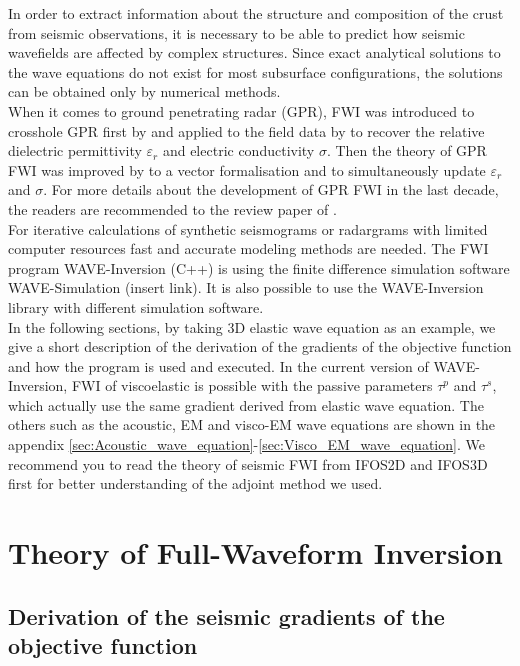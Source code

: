 \documentclass[pdftex,a4paper,parskip,listof=totoc,bibliography=totoc,onehalfspacing,12pt]{scrreprt}
\begin{document}
In order to extract information about the structure and composition of the crust from seismic observations, it is necessary to be able to predict how seismic wavefields are affected by complex structures. Since exact analytical
solutions to the wave equations do not exist for most subsurface configurations, the solutions can be obtained only by numerical methods. \\
When it comes to ground penetrating radar (GPR), FWI was introduced to crosshole GPR first by \cite{ernst2007full} and applied to the field data by \cite{ernst2007application} to recover the relative dielectric permittivity $\varepsilon_r$ and electric conductivity $\sigma$. Then the theory of GPR FWI was improved by \cite{meles2010new} to a vector formalisation and to simultaneously update  $\varepsilon_r$ and $\sigma$. For more details about the development of GPR FWI in the last decade, the readers are recommended to the review paper of \cite{klotzsche2019review}.\\
For iterative calculations of synthetic seismograms or radargrams with limited computer resources fast and accurate modeling methods are needed. The FWI program WAVE-Inversion (C++) is using the finite difference simulation software WAVE-Simulation (insert link). It is also possible to use the WAVE-Inversion library with different simulation software.\\
In the following sections, by taking 3D elastic wave equation as an example, we give a short description of the derivation of the gradients of the objective function and how the program is used and executed. In the current version of WAVE-Inversion, FWI of viscoelastic is possible with the passive parameters $\tau^p$ and $\tau^s$, which actually use the same gradient derived from elastic wave equation. The others such as the acoustic, EM and visco-EM wave equations are shown in the appendix \ref{sec:Acoustic_wave_equation}-\ref{sec:Visco_EM_wave_equation}.
We recommend you to read the theory of seismic FWI from IFOS2D and IFOS3D first for better understanding of the adjoint method we used. 

\cleardoublepage
\part{Theory of Full-Waveform Inversion}

\chapter{Derivation of the seismic gradients of the objective function}
\end{document}
